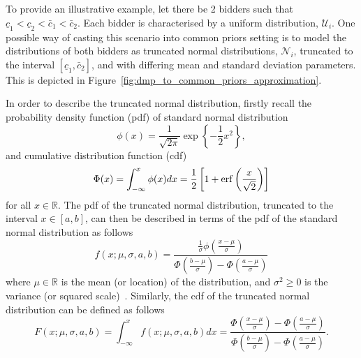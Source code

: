 To provide an illustrative example, let there be 2 bidders such that $\underline{c}_1 < \underline{c}_2 < \bar{c}_1 < \bar{c}_2$. Each bidder is characterised by a uniform distribution, $\mathcal{U}_i$. One possible way of casting this scenario into common priors setting is to model the distributions of both bidders as truncated normal distributions, $\mathcal{N}_i$, truncated to the interval $[\underline{c}_1, \bar{c}_2]$, and with differing mean and standard deviation parameters. This is depicted in Figure~\ref{fig:dmp_to_common_priors_approximation}.

In order to describe the truncated normal distribution, firstly recall the probability density function (pdf) of standard normal distribution
\begin{equation}
  \label{eq:pdf_standard_normal_approximation}
  \displaystyle\phi(x) = \frac{1}{\sqrt{2\pi}} \exp\left\{-\frac{1}{2}x^2\right\},
\end{equation}
and cumulative distribution function (cdf)
\begin{equation}
  \label{eq:cdf_standard_normal_approximation}
  \displaystyle\Phi(x) = \int_{-\infty}^{x}\phi(x)dx = \frac{1}{2}\left[ 1 + \operatorname{erf}\left(\frac{x}{\sqrt{2}}\right) \right]
\end{equation}
for all $x\in\mathbb{R}$. The pdf of the truncated normal distribution, truncated to the interval $x\in[a,b]$, can then be described in terms of the pdf of the standard normal distribution as follows
\begin{equation}
  \label{eq:pdf_truncated_normal_approximation}
  \displaystyle f(x; \mu, \sigma, a, b) = \frac{\frac{1}{\sigma}\phi\left(\frac{x-\mu}{\sigma}\right)}{\Phi\left(\frac{b-\mu}{\sigma}\right) - \Phi\left(\frac{a-\mu}{\sigma}\right)}
\end{equation}
where $\mu\in\mathbb{R}$ is the mean (or location) of the distribution, and $\sigma^2\geq 0$ is the variance (or squared scale)~\cite{JohnsonNormal1994,Cohen1991}. Similarly, the cdf of the truncated normal distribution can be defined as follows
\begin{equation}
  \label{eq:cdf_truncated_normal_approximation}
  \displaystyle F(x; \mu, \sigma, a, b) = \int_{-\infty}^{x}f(x;\mu,\sigma,a,b)dx
  = \frac{\Phi\left(\frac{x-\mu}{\sigma}\right) - \Phi\left(\frac{a-\mu}{\sigma}\right)}{\Phi\left(\frac{b-\mu}{\sigma}\right) - \Phi\left(\frac{a-\mu}{\sigma}\right)}.
\end{equation}

